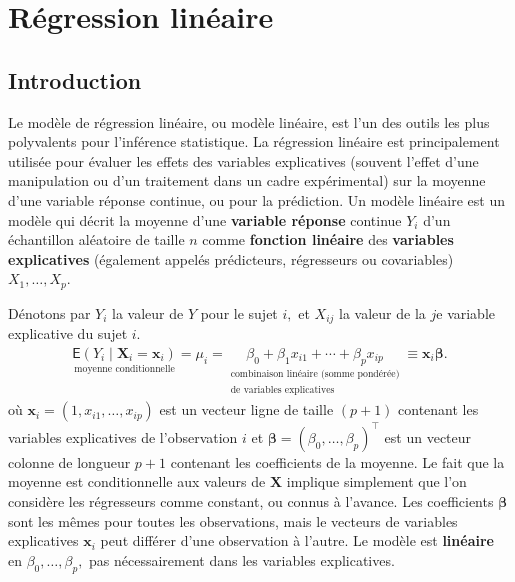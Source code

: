 \documentclass[
  11pt,
  letterpaper,
]{scrbook}
\theoremstyle{plain}
\theoremstyle{plain}
\theoremstyle{definition}
\theoremstyle{definition}
\theoremstyle{remark}
\begin{document}
\chapter{Régression linéaire}\label{regression-lineaire}

\section{Introduction}\label{introduction}

Le modèle de régression linéaire, ou modèle linéaire, est l'un des
outils les plus polyvalents pour l'inférence statistique. La régression
linéaire est principalement utilisée pour évaluer les effets des
variables explicatives (souvent l'effet d'une manipulation ou d'un
traitement dans un cadre expérimental) sur la moyenne d'une variable
réponse continue, ou pour la prédiction. Un modèle linéaire est un
modèle qui décrit la moyenne d'une \textbf{variable réponse} continue
\(Y_i\) d'un échantillon aléatoire de taille \(n\) comme
\textbf{fonction linéaire} des \textbf{variables explicatives}
(également appelés prédicteurs, régresseurs ou covariables)
\(X_1, \ldots, X_p.\)

Dénotons par \(Y_i\) la valeur de \(Y\) pour le sujet \(i,\) et
\(X_{ij}\) la valeur de la \(j\)e variable explicative du sujet \(i.\)
\begin{align}
\underset{\text{moyenne conditionnelle}}{\mathsf{E}(Y_i \mid \boldsymbol{X}_i=\boldsymbol{x}_i)}=\mu_i=\underset{\substack{\text{combinaison linéaire (somme pondérée)}\\ \text{de variables explicatives}}}{\beta_0 + \beta_1x_{i1} + \cdots + \beta_p x_{ip}}\equiv \mathbf{x}_i\boldsymbol{\beta}.
\end{align} où \(\mathbf{x}_i = (1, x_{i1}, \ldots, x_{ip})\) est un
vecteur ligne de taille \((p+1)\) contenant les variables explicatives
de l'observation \(i\) et
\(\boldsymbol{\beta} = (\beta_0, \ldots, \beta_p)^\top\) est un vecteur
colonne de longueur \(p+1\) contenant les coefficients de la moyenne. Le
fait que la moyenne est conditionnelle aux valeurs de \(\mathbf{X}\)
implique simplement que l'on considère les régresseurs comme constant,
ou connus à l'avance. Les coefficients \(\boldsymbol{\beta}\) sont les
mêmes pour toutes les observations, mais le vecteurs de variables
explicatives \(\mathbf{x}_i\) peut différer d'une observation à l'autre.
Le modèle est \textbf{linéaire} en \(\beta_0, \ldots, \beta_p,\) pas
nécessairement dans les variables explicatives.
\end{document}
